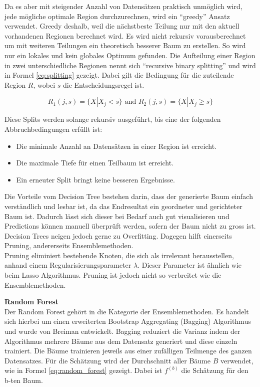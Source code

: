 Da es aber mit steigender Anzahl von Datensätzen praktisch unmöglich wird, jede mögliche optimale Region durchzurechnen, wird ein “greedy” Ansatz verwendet. Greedy deshalb, weil die nächstbeste Teilung nur mit den aktuell vorhandenen Regionen berechnet wird. Es wird nicht rekursiv vorausberechnet um mit weiteren Teilungen ein theoretisch besserer Baum zu erstellen. So wird nur ein lokales und kein globales Optimum gefunden. Die Aufteilung einer Region in zwei unterschiedliche Regionen nennt sich “recursive binary splitting” und wird in Formel \eqref{eq:splitting} gezeigt. Dabei gilt die Bedingung für die zuteilende Region $R$, wobei $s$ die Entscheidungsregel ist.

\begin{equation}\label{eq:splitting}
R_1(j,s) = \{X|X_j < s\} \text{ and } R_2(j,s) = \{X|X_j \geq s\}
\end{equation}

Diese Splits werden solange rekursiv ausgeführt, bis eine der folgenden Abbruchbedingungen erfüllt ist:

\begin{itemize}
\item Die minimale Anzahl an Datensätzen in einer Region ist erreicht.
\item Die maximale Tiefe für einen Teilbaum ist erreicht.
\item Ein erneuter Split bringt keine besseren Ergebnisse.
\end{itemize}

Die Vorteile vom Decision Tree bestehen darin, dass der generierte Baum einfach verständlich und lesbar ist, da das Endresultat ein geordneter und gerichteter Baum ist. Dadurch lässt sich dieser bei Bedarf auch gut visualisieren und Predictions können manuell überprüft werden, sofern der Baum nicht zu gross ist.\\
Decision Trees neigen jedoch gerne zu Overfitting. Dagegen hilft einerseits Pruning, andererseits Ensemblemethoden.\\
Pruning eliminiert bestehende Knoten, die sich als irrelevant herausstellen, anhand einem Regularisierungsparameter $\lambda$. Dieser Parameter ist ähnlich wie beim Lasso Algorithmus. Pruning ist jedoch nicht so verbreitet wie die Ensemblemethoden.

\textbf{Random Forest}\\
Der Random Forest gehört in die Kategorie der Ensemblemethoden. Es handelt sich hierbei um einen erweiterten Bootstrap Aggregating (Bagging) Algorithmus und wurde von Breiman entwickelt. Bagging reduziert die Varianz indem der Algorithmus mehrere Bäume aus dem Datensatz generiert und diese einzeln trainiert.  Die Bäume trainieren jeweils aus einer zufälligen Teilmenge des ganzen Datensatzes. Für die Schätzung wird der Durchschnitt aller Bäume $B$ verwendet, wie in Formel \eqref{eq:random_forest} gezeigt. Dabei ist $f^{(b)}$ die Schätzung für den b-ten Baum.

